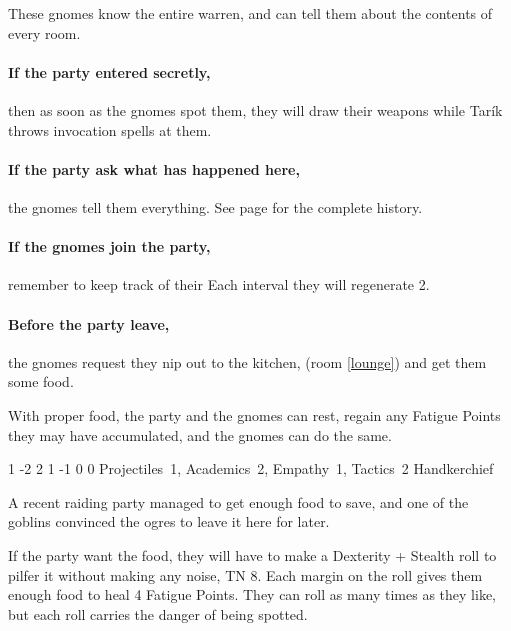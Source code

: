 \begin{multicols}{2}
These gnomes know the entire warren, and can tell them about the contents of every room.

\paragraph{If the party entered secretly,}
then as soon as the gnomes spot them, they will draw their weapons while Tar\'ik throws invocation spells at them.

\paragraph{If the party ask what has happened here,}
the gnomes tell them everything.
See page \pageref{invasionhistory} for the complete history.

\paragraph{If the gnomes join the party,}
remember to keep track of their 
Each \gls{interval} they will regenerate 2.

\paragraph{Before the party leave,}
the gnomes request they nip out to the kitchen, (room \ref{lounge}) and get them some food.

With proper food, the party and the gnomes can rest, regain any Fatigue Points they may have accumulated, and the gnomes can do the same.




{1}%
{-2}%
{{2}%
{1}%
{-1}}%
{0}%
{0}%
{Projectiles~1, Academics~2, Empathy~1, Tactics~2}%
{Handkerchief}%
{
  \setcounter{Fire}{2}
  \setcounter{Air}{2}
}


A recent raiding party managed to get enough food to save, and one of the goblins convinced the ogres to leave it here for later.

If the party want the food, they will have to make a Dexterity + Stealth roll to pilfer it without making any noise, TN 8.
Each margin on the roll gives them enough food to heal 4 Fatigue Points.
They can roll as many times as they like, but each roll carries the danger of being spotted.


\end{multicols}
